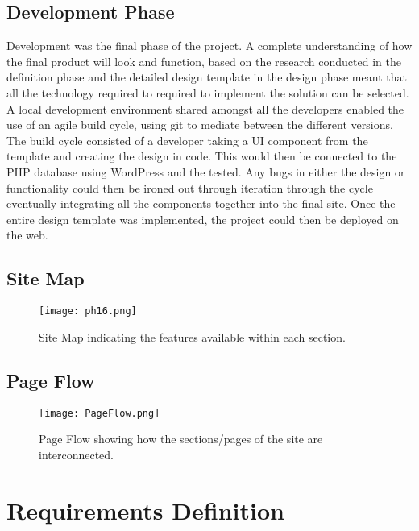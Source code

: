 \documentclass[fontsize=11pt]{extarticle}
\numberwithin{figure}{section} %
\numberwithin{table}{section}%
\begin{document}
\hypertarget{development-phase}{%
\subsection{Development Phase}\label{development-phase}}

Development was the final phase of the project. A complete understanding
of how the final product will look and function, based on the research
conducted in the definition phase and the detailed design template in
the design phase meant that all the technology required to required to
implement the solution can be selected. A local development environment
shared amongst all the developers enabled the use of an agile build
cycle, using git to mediate between the different versions. The build
cycle consisted of a developer taking a UI component from the template
and creating the design in code. This would then be connected to the PHP
database using WordPress and the tested. Any bugs in either the design
or functionality could then be ironed out through iteration through the
cycle eventually integrating all the components together into the final
site. Once the entire design template was implemented, the project could
then be deployed on the web.

\hypertarget{site-map}{%
\subsection{Site Map}\label{site-map}}

\begin{figure}[H]
      \centering
      \texttt{[image: ph16.png]}
      \caption{Site Map indicating the features available within each section.}
      \label{sitemap}
 \end{figure}

\hypertarget{page-flow}{%
\subsection{Page Flow}\label{page-flow}}

\begin{figure}[H]
      \centering
      \texttt{[image: PageFlow.png]}
      \caption{Page Flow showing how the sections/pages of the site are interconnected. }
      \label{pageflow}
 \end{figure}

\newpage

\hypertarget{requirements-definition}{%
\section{Requirements Definition}\label{requirements-definition}}
\end{document}
